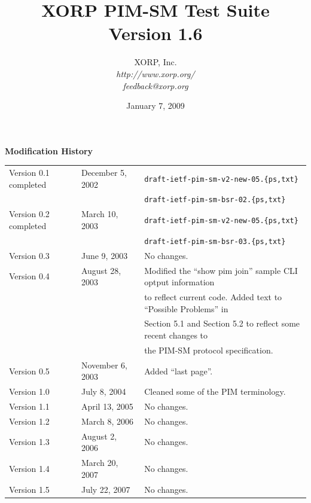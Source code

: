 \documentclass[11pt]{report}
\begin{document}
\title{XORP PIM-SM Test Suite \\
\vspace{1ex}
Version 1.6}
\author{ XORP, Inc.					\\
         {\it http://www.xorp.org/}			\\
	 {\it feedback@xorp.org}
}
\date{January 7, 2009}

\maketitle


\newpage

{\huge \bf Modification History}
\vspace{4ex}

\begin{tabular}{lll}
Version 0.1 completed	& December 5, 2002 & \verb=draft-ietf-pim-sm-v2-new-05.{ps,txt}= \\
			&		   & \verb=draft-ietf-pim-sm-bsr-02.{ps,txt}= \\
Version 0.2 completed	& March 10, 2003 & \verb=draft-ietf-pim-sm-v2-new-05.{ps,txt}= \\
			&		   & \verb=draft-ietf-pim-sm-bsr-03.{ps,txt}= \\
Version 0.3		& June 9, 2003	   & No changes. \\
Version 0.4		& August 28, 2003  & Modified the ``show pim join''
			sample CLI optput information \\
			&		   & to reflect current code. Added
			text to ``Possible Problems'' in \\
			&		   & Section 5.1 and Section 5.2 to
			reflect some recent changes to \\
			&		   & the PIM-SM protocol
			specification. \\
Version 0.5		& November 6, 2003 & Added ``last page''. \\
Version 1.0		& July 8, 2004 & Cleaned some of the PIM
			terminology. \\
Version 1.1		& April 13, 2005	& No changes. \\
Version 1.2		& March 8, 2006		& No changes. \\
Version 1.3		& August 2, 2006	& No changes. \\
Version 1.4		& March 20, 2007	& No changes. \\
Version 1.5		& July 22, 2007		& No changes. \\
\end{tabular}
\end{document}
